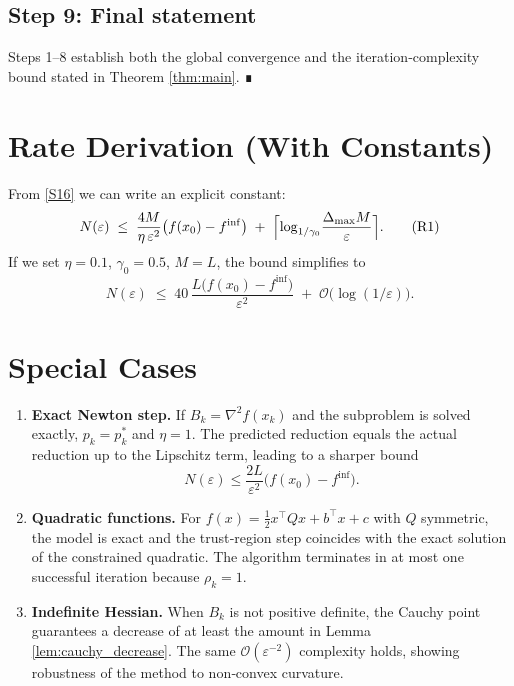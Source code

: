 \documentclass{article}
\begin{document}
\subsection*{Step 9: Final statement}
Steps 1–8 establish both the global convergence and the iteration‑complexity bound stated in Theorem \ref{thm:main}.  ∎

\section*{Rate Derivation (With Constants)}
From \eqref{S16} we can write an explicit constant:
\[
N(\varepsilon)\;\le\;
\frac{4M}{\eta\,\varepsilon^{2}}\bigl(f(x_{0})-f^{\inf}\bigr)
\;+\;
\Bigl\lceil\log_{1/\gamma_{0}}\!\frac{\Delta_{\max}M}{\varepsilon}\Bigr\rceil .
\tag{R1}
\]
If we set $\eta=0.1$, $\gamma_{0}=0.5$, $M=L$, the bound simplifies to
\[
N(\varepsilon)\;\le\;
40\,\frac{L\bigl(f(x_{0})-f^{\inf}\bigr)}{\varepsilon^{2}}
\;+\;
\mathcal{O}\!\bigl(\log(1/\varepsilon)\bigr).
\tag{R2}
\]

\section*{Special Cases}
\begin{enumerate}[label=(\alph*)]
\item \textbf{Exact Newton step.}  If $B_{k}=\nabla^{2}f(x_{k})$ and the subproblem is solved exactly, $p_{k}=p_{k}^{*}$ and $\eta=1$.  The predicted reduction equals the actual reduction up to the Lipschitz term, leading to a sharper bound
\[
N(\varepsilon)\le
\frac{2L}{\varepsilon^{2}}\bigl(f(x_{0})-f^{\inf}\bigr).
\]
\item \textbf{Quadratic functions.}  For $f(x)=\tfrac12 x^{\top}Qx+b^{\top}x+c$ with $Q$ symmetric, the model is exact and the trust‑region step coincides with the exact solution of the constrained quadratic.  The algorithm terminates in at most one successful iteration because $\rho_{k}=1$.
\item \textbf{Indefinite Hessian.}  When $B_{k}$ is not positive definite, the Cauchy point guarantees a decrease of at least the amount in Lemma \ref{lem:cauchy_decrease}.  The same $\mathcal{O}(\varepsilon^{-2})$ complexity holds, showing robustness of the method to non‑convex curvature.
\end{enumerate}
\end{document}
